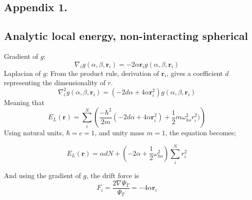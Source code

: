 \documentclass[%
oneside,                 %
final,                   %
10pt]{article}
\begin{document}
\begin{appendices}
\section*{Appendix 1.} \label{APP_1}
\subsection*{Analytic local energy, non-interacting spherical} \label{APP_1:le_1}
Gradient of $g$:
\begin{equation*}
{\nabla }_{i} g(\alpha,\beta,\mathbf{r}_i)=-2\alpha \mathbf{r}_i g(\alpha,\beta,\mathbf{r}_i)
\end{equation*}
Laplacian of $g$:
From the product rule, derivation of $ \mathbf{r}_i$, gives a coefficient $d$ representing the dimensionality of $r$. 
\begin{equation*}
{\nabla }_{i}^2  g(\alpha,\beta,\mathbf{r}_i)=  (-2d \alpha  + 4 \alpha  \mathbf{r}_i^2) g(\alpha,\beta,\mathbf{r}_i)
\end{equation*}
Meaning that
\begin{equation*}
        E_L(\mathbf{r}) =  \sum_i^N \left(\frac{-\hbar^2}{2m}(-2 d \alpha + 4 \alpha  \mathbf{r}_i^2) + \frac{1}{2}m\omega_{ho}^2r_i^2 )\right)  
 \end{equation*}
Using natural units, $\hbar=c=1$, and unity mass $m=1$, the equation becomes;

\begin{equation*}
        E_L(\mathbf{r}) =  \alpha d N + \left( - 2 \alpha    + \frac{1}{2} \omega_{ho}^2\right)  \sum_i^N r_i^2 
\end{equation*}

And using the gradient of $g$, the drift force is
\begin{equation*}
F_i = \frac{2\nabla \Psi_T}{\Psi_T}= -4\alpha \mathbf{r}_i 
\end{equation*}


\end{appendices}
\end{document}
